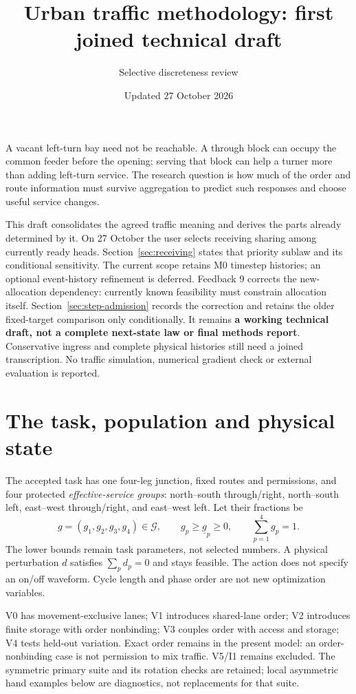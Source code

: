 \documentclass[11pt]{article}
\title{Urban traffic methodology: first joined technical draft}
\author{Selective discreteness review}
\date{Updated 27 October 2026}
\begin{document}
\maketitle
\vspace{-1.5em}

A vacant left-turn bay need not be reachable. A through block can occupy the common feeder before the opening; serving that block can help a turner more than adding left-turn service. The research question is how much of the order and route information must survive aggregation to predict such responses and choose useful service changes.

This draft consolidates the agreed traffic meaning and derives the parts already determined by it. On 27 October the user selects receiving sharing among currently ready heads. Section~\ref{sec:receiving} states that priority sublaw and its conditional sensitivity. The current scope retains M0 timestep histories; an optional event-history refinement is deferred. Feedback 9 corrects the new-allocation dependency: currently known feasibility must constrain allocation itself. Section~\ref{sec:step-admission} records the correction and retains the older fixed-target comparison only conditionally. It remains \textbf{a working technical draft, not a complete next-state law or final methods report}. Conservative ingress and complete physical histories still need a joined transcription. No traffic simulation, numerical gradient check or external evaluation is reported.

\section{The task, population and physical state}

The accepted task has one four-leg junction, fixed routes and permissions, and four protected \emph{effective-service groups}: north--south through/right, north--south left, east--west through/right, and east--west left. Let their fractions be
\begin{equation}
 g=(g_1,g_2,g_3,g_4)\in\mathcal G,
 \qquad g_p\geq \underline g_p\geq0,\qquad \sum_{p=1}^4 g_p=1.
 \label{eq:action}
\end{equation}
The lower bounds remain task parameters, not selected numbers. A physical perturbation $d$ satisfies $\sum_p d_p=0$ and stays feasible. The action does not specify an on/off waveform. Cycle length and phase order are not new optimization variables.

V0 has movement-exclusive lanes; V1 introduces shared-lane order; V2 introduces finite storage with order nonbinding; V3 couples order with access and storage; V4 tests held-out variation. Exact order remains in the present model: an order-nonbinding case is not permission to mix traffic. V5/I1 remains excluded. The symmetric primary suite and its rotation checks are retained; local asymmetric hand examples below are diagnostics, not replacements for that suite.
\end{document}
